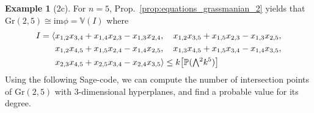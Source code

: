 \documentclass{scrartcl}
\newcommand{\V}{\mathbb{V}}
\newcommand{\Proj}{\mathbb{P}}
\newcommand{\Gr}{\mathrm{Gr}}
\newcommand{\extpow}{\mathchoice{{\textstyle\bigwedge}}
    {{\bigwedge}}
    {{\textstyle\wedge}}
    {{\scriptstyle\wedge}}}
\theoremstyle{definition}
\newtheorem{example}[definition]{Example}
\begin{document}
\begin{example}[2c]
    For $n = 5$, Prop.~\ref{prop:equations_grassmanian_2} yields that $\Gr(2, 5) \cong \mathrm{im}\phi = \V(I)$ where
    \begin{align*}
        I = \langle &x_{1, 2} x_{3, 4} + x_{1, 4} x_{2, 3} - x_{1, 3} x_{2, 4}, \quad x_{1, 2} x_{3, 5} + x_{1, 5} x_{2, 3} - x_{1, 3} x_{2, 5}, \\
        &x_{1, 2} x_{4, 5} + x_{1, 5} x_{2, 4} - x_{1, 4} x_{2, 5}, \quad x_{1, 3} x_{4, 5} + x_{1, 5} x_{3, 4} - x_{1, 4} x_{3, 5}, \\ 
        &x_{2, 3} x_{4, 5} + x_{2, 5} x_{3, 4} - x_{2, 4} x_{3, 5} \rangle \leq k\bigl[ \Proj(\extpow^2 k^5) \bigr]
    \end{align*}
    Using the following Sage-code, we can compute the number of intersection points of $\Gr(2, 5)$ with 3-dimensional hyperplanes, and find a probable value for its degree.
    
\end{example}
\end{document}

